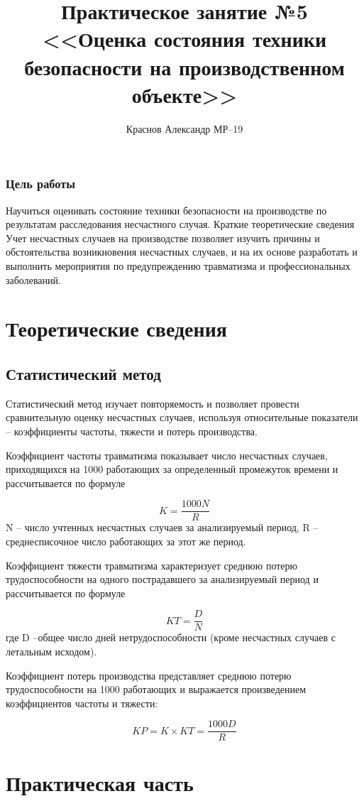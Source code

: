 \documentclass[a5paper, 12dd, twoside]{article}
\title{Практическое занятие №5\\<<Оценка состояния техники безопасности на производственном объекте>>}
\author{Краснов Александр МР--19}
\begin{document}
\maketitle
\tableofcontents
\clearpage

\subsubsection*{Цель работы}
Научиться оценивать состояние техники безопасности на производстве по результатам расследования несчастного случая. Краткие теоретические сведения Учет несчастных случаев на производстве позволяет изучить причины и обстоятельства возникновения несчастных случаев, и на их основе разработать и выполнить мероприятия по предупреждению травматизма и профессиональных заболеваний.

\section{Теоретические сведения}
\subsection*{Статистический метод}
Статистический метод изучает повторяемость и позволяет провести сравнительную оценку несчастных случаев, используя относительные показатели – коэффициенты частоты, тяжести и потерь производства. 

Коэффициент частоты травматизма показывает число несчастных случаев, приходящихся на 1000 работающих за определенный промежуток времени и рассчитывается по формуле

\[K = \frac{1000 N}{R}\]
N -- число учтенных несчастных случаев за анализируемый период, R -- среднесписочное число работающих за этот же период.

Коэффициент тяжести травматизма характеризует среднюю потерю трудоспособности на одного пострадавшего за анализируемый период и рассчитывается по формуле

\[KT = \frac{D}{N}\]
где D –общее число дней нетрудоспособности (кроме несчастных случаев с летальным исходом).

Коэффициент потерь производства представляет среднюю потерю трудоспособности на 1000 работающих и выражается произведением коэффициентов частоты и тяжести:

\[KP = K \times KT = \frac{1000 D}{R}\]


\section{Практическая часть}
\end{document}
